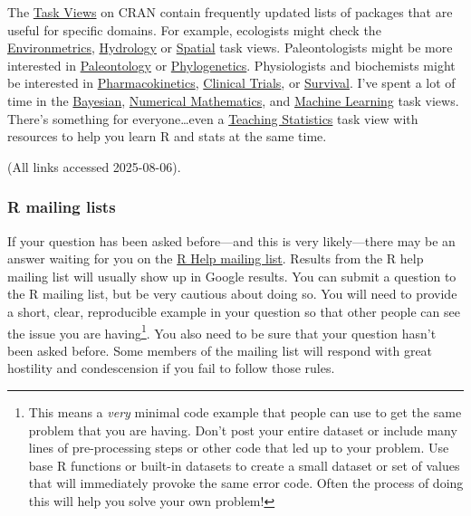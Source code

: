 \documentclass[
  13,
  letterpaper,
]{report}
\begin{document}
The \href{https://cran.r-project.org/web/views/}{Task Views} on CRAN
contain frequently updated lists of packages that are useful for
specific domains. For example, ecologists might check the
\href{https://cran.r-project.org/web/views/Environmetrics.html}{Environmetrics},
\href{https://cran.r-project.org/web/views/Hydrology.html}{Hydrology} or
\href{https://cran.r-project.org/web/views/Spatial.html}{Spatial} task
views. Paleontologists might be more interested in
\href{https://cran.r-project.org/web/views/Paleontology.html}{Paleontology}
or
\href{https://cran.r-project.org/web/views/Phylogenetics.html}{Phylogenetics}.
Physiologists and biochemists might be interested in
\href{https://cran.r-project.org/web/views/Pharmacokinetics.html}{Pharmacokinetics},
\href{https://cran.r-project.org/web/views/ClinicalTrials.html}{Clinical
Trials}, or
\href{https://cran.r-project.org/web/views/Survival.html}{Survival}.
I've spent a lot of time in the
\href{https://cran.r-project.org/web/views/Bayesian.html}{Bayesian},
\href{https://cran.r-project.org/web/views/NumericalMathematics.html}{Numerical
Mathematics}, and
\href{https://cran.r-project.org/web/views/MachineLearning.html}{Machine
Learning} task views. There's something for everyone\ldots even a
\href{https://cran.r-project.org/web/views/TeachingStatistics.html}{Teaching
Statistics} task view with resources to help you learn R and stats at
the same time.

(All links accessed 2025-08-06).

\subsubsection{R mailing lists}\label{sec-02-faq-help-mail}

If your question has been asked before---and this is very likely---there
may be an answer waiting for you on the
\href{https://www.r-project.org/mail.html}{R Help mailing list}. Results
from the R help mailing list will usually show up in Google results. You
can submit a question to the R mailing list, but be very cautious about
doing so. You will need to provide a short, clear, reproducible example
in your question so that other people can see the issue you are
having\footnote{This means a \emph{very} minimal code example that
  people can use to get the same problem that you are having. Don't post
  your entire dataset or include many lines of pre-processing steps or
  other code that led up to your problem. Use base R functions or
  built-in datasets to create a small dataset or set of values that will
  immediately provoke the same error code. Often the process of doing
  this will help you solve your own problem!}. You also need to be sure
that your question hasn't been asked before. Some members of the mailing
list will respond with great hostility and condescension if you fail to
follow those rules.
\end{document}
